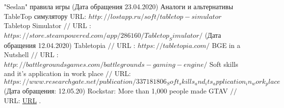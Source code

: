 \makeatletter \renewcommand{} \makeatother
\renewcommand\refname{Список использованных источников}
\begin{thebibliography}{00}
	
	 "Seslan" правила игры (Дата обращения 23.04.2020)
	Аналоги и альтернативы TableTop симулятору
	URL: $http://lostapp.ru/soft/tabletop-simulator$
	Tabletop Simulator $//$ URL : $https://store.steampowered.com/app/286160/Tabletop_Simulator/$ (Дата обращения 12.04.2020)
	Tabletopia $//$ URL : $https://tabletopia.com/$
	 BGE in a Nutshell $//$ URL : $http://battlegroundsgames.com/battlegrounds-gaming-engine/$
	Soft skills and it's application in work place $//$ URL: $https://www.researchgate.net/publication/337181806_Soft_skills_and_its_application_in_work_place$ (Дата обращения: 12.05.20)
	Rockstar: More than 1,000 people made GTAV $//$ URL: \url{URL} $.$
\end{thebibliography}
